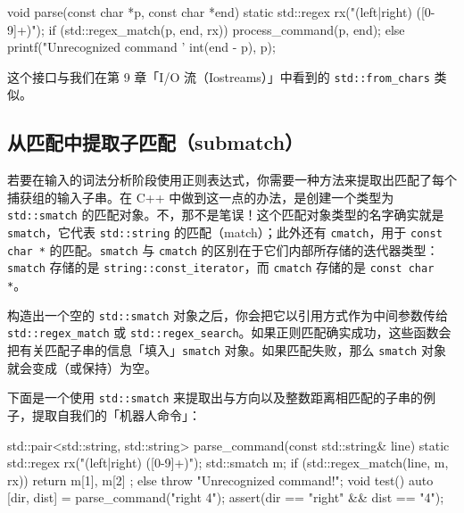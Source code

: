 \begin{codebox}[cpp]
     void parse(const char *p, const char *end)
     {
       static std::regex rx("(left|right) ([0-9]+)");
       if (std::regex_match(p, end, rx)) {
         process_command(p, end);
       } else {
         printf("Unrecognized command '%
           int(end - p), p);
       }
     }
\end{codebox}

这个接口与我们在第 9 章「I/O 流（Iostreams）」中看到的 \texttt{std::\allowbreak{}from\_\allowbreak{}chars} 类似。

\subsection{从匹配中提取子匹配（submatch）}

若要在输入的词法分析阶段使用正则表达式，你需要一种方法来提取出匹配了每个捕获组的输入子串。在 C++ 中做到这一点的办法，是创建一个类型为 \texttt{std::\allowbreak{}smatch} 的匹配对象。不，那不是笔误！这个匹配对象类型的名字确实就是 \texttt{smatch}，它代表 \texttt{std::\allowbreak{}string} 的匹配（match）；此外还有 \texttt{cmatch}，用于 \texttt{const char *} 的匹配。\texttt{smatch} 与 \texttt{cmatch} 的区别在于它们内部所存储的迭代器类型：\texttt{smatch} 存储的是 \texttt{string::\allowbreak{}const\_\allowbreak{}iterator}，而 \texttt{cmatch} 存储的是 \texttt{const char *}。

构造出一个空的 \texttt{std::\allowbreak{}smatch} 对象之后，你会把它以引用方式作为中间参数传给 \texttt{std::\allowbreak{}regex\_\allowbreak{}match} 或 \texttt{std::\allowbreak{}regex\_\allowbreak{}search}。如果正则匹配确实成功，这些函数会把有关匹配子串的信息「填入」\texttt{smatch} 对象。如果匹配失败，那么 \texttt{smatch} 对象就会变成（或保持）为空。

下面是一个使用 \texttt{std::\allowbreak{}smatch} 来提取出与方向以及整数距离相匹配的子串的例子，提取自我们的「机器人命令」：

\begin{codebox}[cpp]
     std::pair<std::string, std::string>
     parse_command(const std::string& line)
     {
       static std::regex rx("(left|right) ([0-9]+)");
       std::smatch m;
       if (std::regex_match(line, m, rx)) {
         return { m[1], m[2] };
       } else {
         throw "Unrecognized command!";
       }
     }
     void test() {
       auto [dir, dist] = parse_command("right 4");
       assert(dir == "right" && dist == "4");
     }
\end{codebox}

